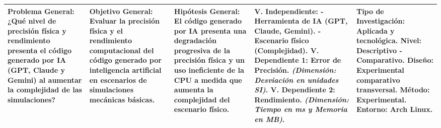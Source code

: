 \begin{landscape}
\begin{table}[ht]
\begin{tabularx}{\linewidth}{|X|X|X|X|X|}
\textbf{Problema General:} \newline ¿Qué nivel de precisión física y rendimiento presenta el código generado por IA (GPT, Claude y Gemini) al aumentar la complejidad de las simulaciones? & 
\textbf{Objetivo General:} \newline Evaluar la precisión física y el rendimiento computacional del código generado por inteligencia artificial en escenarios de simulaciones mecánicas básicas. & 
\textbf{Hipótesis General:} \newline El código generado por IA presenta una degradación progresiva de la precisión física y un uso ineficiente de la CPU a medida que aumenta la complejidad del escenario físico. & 
\textbf{V. Independiente:} \newline - Herramienta de IA (GPT, Claude, Gemini). \newline - Escenario físico (Complejidad). \newline \newline \textbf{V. Dependiente 1:} \newline Error de Precisión. \newline \textit{(Dimensión: Desviación en unidades SI)}. \newline \newline \textbf{V. Dependiente 2:} \newline Rendimiento. \newline \textit{(Dimensión: Tiempo en ms y Memoria en MB)}. & 
\textbf{Tipo de Investigación:} \newline Aplicada y tecnológica. \newline \newline \textbf{Nivel:} \newline Descriptivo - Comparativo. \newline \newline \textbf{Diseño:} \newline Experimental comparativo transversal. \newline \newline \textbf{Método:} \newline Experimental. \newline \newline \textbf{Entorno:} \newline Arch Linux. \\ \hline


\end{tabularx}
\end{table}
\end{landscape}
